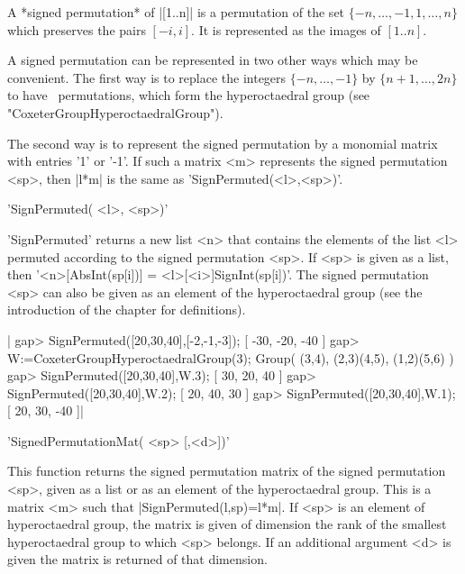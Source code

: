 

A   *signed  permutation*  of   |[1..n]|  is  a   permutation  of  the  set
$\{-n,\ldots,-1,1,\ldots,n\}$  which  preserves  the  pairs $[-i,i]$. It is
represented  as the images of $[1..n]$.

A  signed permutation  can be  represented in  two other  ways which may be
convenient.  The first way is to replace the integers $\{-n,\ldots,-1\}$ by
$\{n+1,\ldots,2n\}$   to   have   \GAP\   permutations,   which   form  the
hyperoctaedral group (see "CoxeterGroupHyperoctaedralGroup").

The  second way is to represent the signed permutation by a monomial matrix
with  entries  '1'  or  '-1'.  If  such  a matrix <m> represents the signed
permutation <sp>, then |l*m| is the same as 'SignPermuted(<l>,<sp>)'.

%
%

'SignPermuted( <l>, <sp>)'

'SignPermuted'  returns a  new list  <n> that  contains the elements of the
list  <l> permuted  according to  the signed  permutation <sp>.  If <sp> is
given  as a  list, then  '<n>[AbsInt(sp[i])] = <l>[<i>]SignInt(sp[i])'. The
signed   permutation  <sp>  can  also  be   given  as  an  element  of  the
hyperoctaedral group (see the introduction of the chapter for definitions).

|    gap> SignPermuted([20,30,40],[-2,-1,-3]);
    [ -30, -20, -40 ]
    gap> W:=CoxeterGroupHyperoctaedralGroup(3);
    Group( (3,4), (2,3)(4,5), (1,2)(5,6) )
    gap> SignPermuted([20,30,40],W.3);
    [ 30, 20, 40 ]
    gap> SignPermuted([20,30,40],W.2);
    [ 20, 40, 30 ]
    gap> SignPermuted([20,30,40],W.1);
    [ 20, 30, -40 ]|

%
%

'SignedPermutationMat( <sp> [,<d>])'

This   function  returns  the  signed  permutation  matrix  of  the  signed
permutation  <sp>, given as a  list or as an  element of the hyperoctaedral
group.  This is a matrix <m> such that |SignPermuted(l,sp)=l*m|. If <sp> is
an  element of hyperoctaedral  group, the matrix  is given of dimension the
rank  of the  smallest hyperoctaedral  group to  which <sp>  belongs. If an
additional argument <d> is given the matrix is returned of that dimension.

